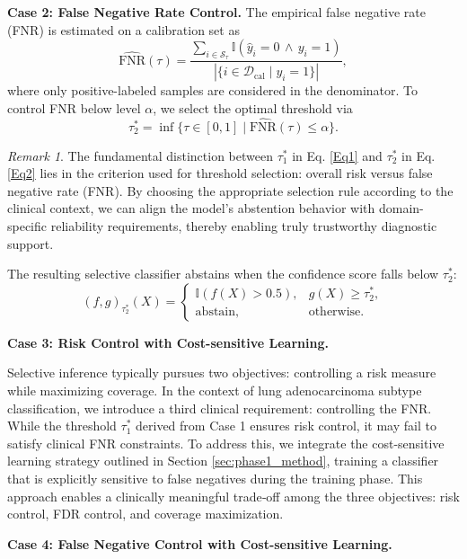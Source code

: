\documentclass[journal]{IEEEtran}
\theoremstyle{remark}
\newtheorem{remark}[theorem]{Remark}
\begin{document}
\textbf{Case 2: False Negative Rate Control.}
The empirical false negative rate (FNR) is estimated on a calibration set as
\[
\widehat{\mathrm{FNR}}(\tau)=\frac{\sum_{i \in\mathcal{S}_\tau}\mathbb{I}(\hat{y}_i=0\,\wedge\, y_i=1)}{|\{i\in\mathcal{D}_{\mathrm{cal}}\mid y_i=1\}|},
\]
where only positive-labeled samples are considered in the denominator. To control FNR below level $\alpha$, we select the optimal threshold via 
\begin{equation}\label{Eq2}
  \tau_{2}^*=\inf\{\tau\in[0,1]\mid \widehat{\mathrm{FNR}}(\tau)\leq\alpha\}.  
\end{equation}

\begin{remark}
The fundamental distinction between $\tau_{1}^{*}$ in Eq. \ref{Eq1} and $\tau_{2}^{*}$ in Eq. \ref{Eq2} lies in the criterion used for threshold selection: overall risk versus false negative rate (FNR). By choosing the appropriate selection rule according to the clinical context, we can align the model's abstention behavior with domain-specific reliability requirements, thereby enabling truly trustworthy diagnostic support.
\end{remark}

The resulting selective classifier abstains when the confidence score falls below $\tau_{2}^*$:
\[
(f,g)_{\tau_{2}^*}(X)=
\begin{cases}
\mathbb{I}\!\left(f(X)>0.5\right), & g(X)\geq \tau_{2}^*,\\[4pt]
\text{abstain}, & \text{otherwise}.
\end{cases}
\]


\textbf{Case 3: Risk Control with Cost-sensitive Learning.}

Selective inference typically pursues two objectives: controlling a risk measure while maximizing coverage. In the context of lung adenocarcinoma subtype classification, we introduce a third clinical requirement: controlling the FNR. While the threshold \(\tau_{1}^{*}\) derived from Case 1 ensures risk control, it may fail to satisfy clinical FNR constraints. To address this, we integrate the cost-sensitive learning strategy outlined in Section \ref{sec:phase1_method}, training a classifier that is explicitly sensitive to false negatives during the training phase. This approach enables a clinically meaningful trade‑off among the three objectives: risk control, FDR control, and coverage maximization.

\textbf{Case 4: False Negative Control with Cost-sensitive Learning.}
\end{document}
